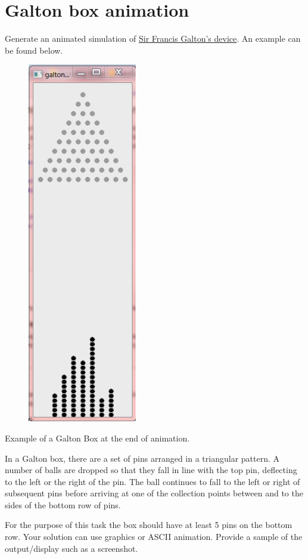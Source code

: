 \pagebreak{}
\section*{Galton box animation}

Generate an animated simulation of
\href{http://en.wikipedia.org/wiki/Bean\_machine}{Sir Francis Galton's
  device}. An example can be found below.


\begin{figure}[H]
  \centering
\includegraphics[scale=.6]{graphics/180px-Galtonbox-Unicon.PNG}  
\end{figure}

Example of a Galton Box at the end of animation.

In a Galton box, there are a set of pins arranged in a triangular
pattern. A number of balls are dropped so that they fall in line with
the top pin, deflecting to the left or the right of the pin. The ball
continues to fall to the left or right of subsequent pins before
arriving at one of the collection points between and to the sides of the
bottom row of pins.

For the purpose of this task the box should have at least 5 pins on the
bottom row. Your solution can use graphics or ASCII animation. Provide a
sample of the output/display such as a screenshot.

